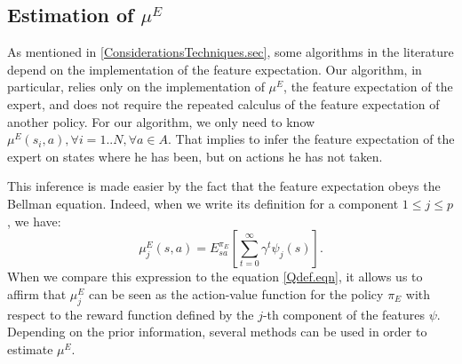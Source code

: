 \documentclass{article}
\begin{document}
\subsection{Estimation of $\mu^E$}
\label{calculmu.sec}
As mentioned in \ref{ConsiderationsTechniques.sec}, some algorithms in the literature depend on the implementation of the feature expectation. Our algorithm, in particular, relies only on the implementation of $\mu^E$, the feature expectation of the expert, and does not require the repeated calculus of the feature expectation of another policy. For our algorithm, we only need to know $\mu^E(s_i,a), \forall i= 1..N,\forall a \in A$. That implies to infer the feature expectation of the expert on states where he has been, but on actions he has not taken.

This inference is made easier by the fact that the feature expectation obeys the Bellman equation. Indeed, when we write its definition for a component $1\leq j\leq p$, we have:
\begin{equation}
\mu^E_j(s,a) = E^{\pi_E}_{sa}[\sum\limits_{t=0}^\infty \gamma^t \psi_j(s)].
\end{equation}
When we compare this expression to the equation \eqref{Qdef.eqn}, it allows us to affirm that $\mu_j^E$ can be seen as the action-value function for the policy $\pi_E$ with respect to the reward function defined by the $j$-th component of the features $\psi$. Depending on the prior information, several methods can be used in order to estimate $\mu^E$.\\
\end{document}
